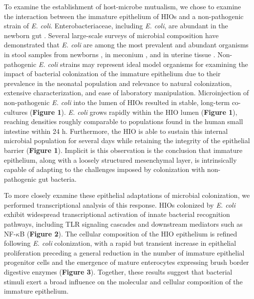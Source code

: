 \documentclass[9pt,lineo]{elife}
\begin{document}
To examine the establishment of host-microbe mutualism, we chose to examine the interaction between the immature epithelium of HIOs and a non-pathogenic strain of \emph{E. coli}. Enterobacteriaceae, including \emph{E. coli}, are abundant in the newborn gut \citep{Palmer:2007,Koenig:2011,Backhed:2015,Yassour:2016}. Several large-scale surveys of microbial composition have demonstrated that \emph{E. coli} are among the most prevalent and abundant organisms in stool samples from newborns \citep{Backhed:2015,Koenig:2011}, in meconium \citep{Gosalbes:2013}, and in uterine tissue \citep{Aagaard:2014}. Non-pathogenic \emph{E. coli} strains may represent ideal model organisms for examining the impact of bacterial colonization of the immature epithelium due to their prevalence in the neonatal population and relevance to natural colonization, extensive characterization, and ease of laboratory manipulation. Microinjection of non-pathogenic \emph{E. coli} into the lumen of HIOs resulted in stable, long-term co-cultures (\textbf{Figure 1}). \emph{E. coli} grows rapidly within the HIO lumen (\textbf{Figure 1}), reaching densities roughly comparable to populations found in the human small intestine \citep{Donaldson:2016} within 24 h. Furthermore, the HIO is able to sustain this internal microbial population for several days while retaining the integrity of the epithelial barrier (\textbf{Figure 1}). Implicit is this observation is the conclusion that immature epithelium, along with a loosely structured mesenchymal layer, is intrinsically capable of adapting to the challenges imposed by colonization with non-pathogenic gut bacteria. 

To more closely examine these epithelial adaptations of microbial colonization, we performed transcriptional analysis of this response. HIOs colonized by \emph{E. coli} exhibit widespread transcriptional activation of innate bacterial recognition pathways, including TLR signaling cascades and downstream mediators such as NF-\(\kappa\)B (\textbf{Figure 2}). The cellular composition of the HIO epithelium is refined following \emph{E. coli} colonization, with a rapid but transient increase in epithelial proliferation preceding a general reduction in the number of immature epithelial progenitor cells and the emergence of mature enterocytes expressing brush border digestive enzymes (\textbf{Figure 3}). Together, these results suggest that bacterial stimuli exert a broad influence on the molecular and cellular composition of the immature epithelium.
\end{document}
